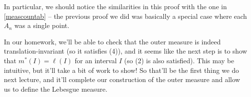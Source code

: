 In particular, we should notice the similarities in this proof with the one in \cref{meascountab} -- the previous proof we did was basically a special case where each $A_n$ was a single point.

In our homework, we'll be able to check that the outer measure is indeed translation-invariant (so it satisfies (4)), and it seems like the next step is to show that $m^\ast(I) = \ell(I)$ for an interval $I$ (so (2) is also satisfied). This may be intuitive, but it'll take a bit of work to show! So that'll be the first thing we do next lecture, and it'll complete our construction of the outer measure and allow us to define the Lebesgue measure.